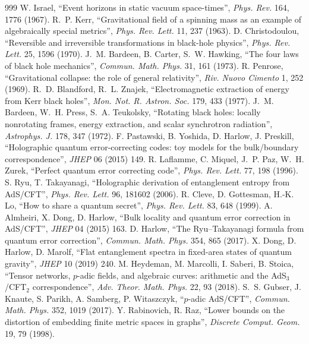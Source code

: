 \documentclass[11pt,a4paper]{article}
\theoremstyle{definition}
\theoremstyle{remark}
\theoremstyle{definition}
\begin{document}
\begin{thebibliography}{999}
 W. Israel, ``Event horizons in static vacuum space-times'', \emph{Phys. Rev.} 164, 1776 (1967).
 R.~P. Kerr, ``Gravitational field of a spinning mass as an example of algebraically special metrics'', \emph{Phys. Rev.
Lett.} 11, 237 (1963).
 D. Christodoulou, ``Reversible and irreversible transformations in black-hole physics'', \emph{Phys. Rev. Lett.}
25, 1596 (1970).
 J.~M. Bardeen, B. Carter, S.~W. Hawking, ``The four laws of black hole mechanics'', \emph{Commun. Math. Phys.} 31, 161
(1973).
 R. Penrose, ``Gravitational collapse: the role of general relativity'', \emph{Riv. Nuovo Cimento} 1, 252 (1969).
 R.~D. Blandford, R.~L. Znajek, ``Electromagnetic extraction of energy from Kerr black holes'', \emph{Mon. Not. R. Astron.
Soc.} 179, 433 (1977).
 J.~M. Bardeen, W.~H. Press, S.~A. Teukolsky, ``Rotating black holes: locally nonrotating frames, energy extraction, and
scalar synchrotron radiation'', \emph{Astrophys. J.} 178, 347 (1972).
 F. Pastawski, B. Yoshida, D. Harlow, J. Preskill, ``Holographic quantum error-correcting codes: toy models for the
bulk/boundary correspondence'', \emph{JHEP} 06 (2015) 149.
 R. Laflamme, C. Miquel, J.~P. Paz, W.~H. Zurek, ``Perfect quantum error correcting code'', \emph{Phys. Rev. Lett.}
77, 198 (1996).
 S. Ryu, T. Takayanagi, ``Holographic derivation of entanglement entropy from AdS/CFT'', \emph{Phys. Rev. Lett.} 96, 181602
(2006).
 R. Cleve, D. Gottesman, H.-K. Lo, ``How to share a quantum secret'', \emph{Phys. Rev. Lett.} 83, 648 (1999).
 A. Almheiri, X. Dong, D. Harlow, ``Bulk locality and quantum error correction in AdS/CFT'', \emph{JHEP} 04 (2015) 163.
 D. Harlow, ``The Ryu--Takayanagi formula from quantum error correction'', \emph{Commun. Math. Phys.} 354, 865 (2017).
 X. Dong, D. Harlow, D. Marolf, ``Flat entanglement spectra in fixed-area states of quantum gravity'', \emph{JHEP} 10
(2019) 240.
 M. Heydeman, M. Marcolli, I. Saberi, B. Stoica, ``Tensor networks, $p$-adic fields, and algebraic curves: arithmetic and
the AdS$_3$/CFT$_2$ correspondence'', \emph{Adv. Theor. Math. Phys.} 22, 93 (2018).
 S.~S. Gubser, J. Knaute, S. Parikh, A. Samberg, P. Witaszczyk, ``$p$-adic AdS/CFT'', \emph{Commun. Math. Phys.} 352,
1019 (2017).
 Y. Rabinovich, R. Raz, ``Lower bounds on the distortion of embedding finite metric spaces in graphs'', \emph{Discrete
Comput. Geom.} 19, 79 (1998).

\end{thebibliography}
\end{document}
